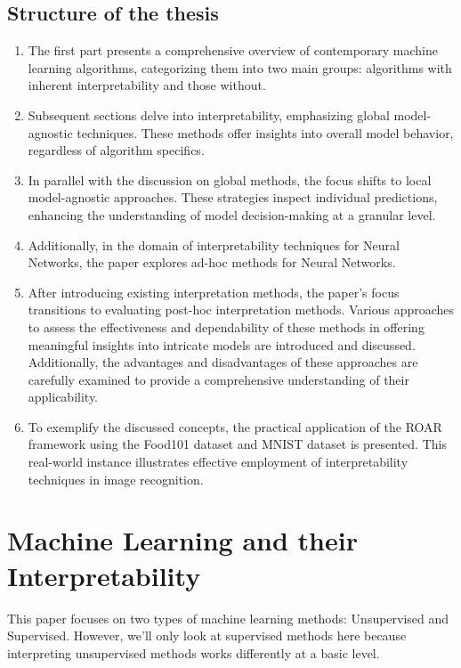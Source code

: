 \newpage
\section{Structure of the thesis}

\begin{enumerate}
	\item The first part presents a comprehensive overview of contemporary machine learning algorithms, categorizing them into two main groups: algorithms with inherent interpretability and those without.
	\item Subsequent sections delve into interpretability, emphasizing global model-agnostic techniques. These methods offer insights into overall model behavior, regardless of algorithm specifics. 
	\item In parallel with the discussion on global methods, the focus shifts to local model-agnostic approaches. These strategies inspect individual predictions, enhancing the understanding of model decision-making at a granular level.
	\item Additionally, in the domain of interpretability techniques for Neural Networks, the paper explores ad-hoc methods for Neural Networks.
	\item After introducing existing interpretation methods, the paper's focus transitions to evaluating post-hoc interpretation methods. Various approaches to assess the effectiveness and dependability of these methods in offering meaningful insights into intricate models are introduced and discussed. Additionally, the advantages and disadvantages of these approaches are carefully examined to provide a comprehensive understanding of their applicability.
	\item To exemplify the discussed concepts, the practical application of the ROAR framework using the Food101 dataset and MNIST dataset is presented. This real-world instance illustrates effective employment of interpretability techniques in image recognition.
\end{enumerate}



\chapter{Machine Learning and their Interpretability}


This paper focuses on two types of machine learning methods: Unsupervised and Supervised. However, we'll only look at supervised methods here because interpreting unsupervised methods works differently at a basic level.

